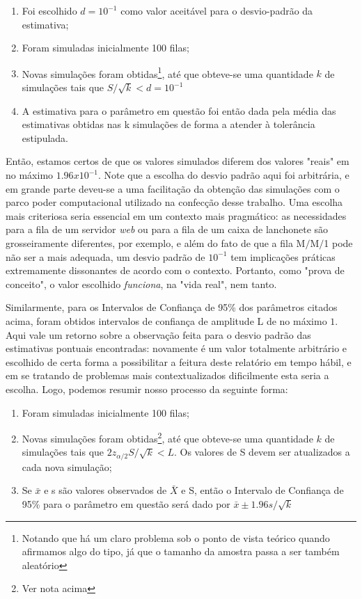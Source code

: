 \documentclass[a4paper,12pt,english,brazil]{article}
\begin{document}
\begin{enumerate}
\item Foi escolhido $d = 10^{-1}$ como valor aceitável para o desvio-padrão da estimativa;
\item Foram simuladas inicialmente 100 filas;
\item Novas simulações foram obtidas\footnote{Notando que há um claro problema sob o ponto de vista teórico quando afirmamos algo do tipo, já que o tamanho da amostra passa a ser também aleatório}, até que obteve-se uma quantidade $k$ de simulações tais que $S/\sqrt{k} < d = 10^{-1}$
\item A estimativa para o parâmetro em questão foi então dada pela média das estimativas obtidas nas k simulações de forma a atender à tolerância estipulada.
\end{enumerate}
Então, estamos certos de que os valores simulados diferem dos valores "reais" em no máximo $1.96x10^{-1}$. Note que a escolha do desvio padrão aqui foi arbitrária, e em grande parte deveu-se a uma facilitação da obtenção das simulações com o parco poder computacional utilizado na confecção desse trabalho. Uma escolha mais criteriosa seria essencial em um contexto mais pragmático: as necessidades para a fila de um servidor \textit{web} ou para a fila de um caixa de lanchonete são grosseiramente diferentes, por exemplo, e além do fato de que a fila M$/$M$/$1 pode não ser a mais adequada, um desvio padrão de $10^{-1}$ tem implicações práticas extremamente dissonantes de acordo com o contexto. Portanto, como "prova de conceito", o valor escolhido \textit{funciona}, na "vida real", nem tanto.

Similarmente, para os Intervalos de Confiança de 95\% dos parâmetros citados acima, foram obtidos intervalos de confiança de amplitude L de no máximo $1$. Aqui vale um retorno sobre a observação feita para o desvio padrão das estimativas pontuais encontradas: novamente é um valor totalmente arbitrário e escolhido de certa forma a possibilitar a feitura deste relatório em tempo hábil, e em se tratando de problemas mais contextualizados dificilmente esta seria a escolha. Logo, podemos resumir nosso processo da seguinte forma:

\begin{enumerate}
\item Foram simuladas inicialmente 100 filas;
\item Novas simulações foram obtidas\footnote{Ver nota acima}, até que obteve-se uma quantidade $k$ de simulações tais que $2z_{\alpha/2}S/\sqrt{k} < L$. Os valores de S devem ser atualizados a cada nova simulação;
\item Se $\bar{x}$ e s são valores observados de $\bar{X}$ e S, então o Intervalo de Confiança de 95\% para o parâmetro em questão será dado por $\bar{x} \pm 1.96s/\sqrt{k}$
\end{enumerate}
\end{document}
